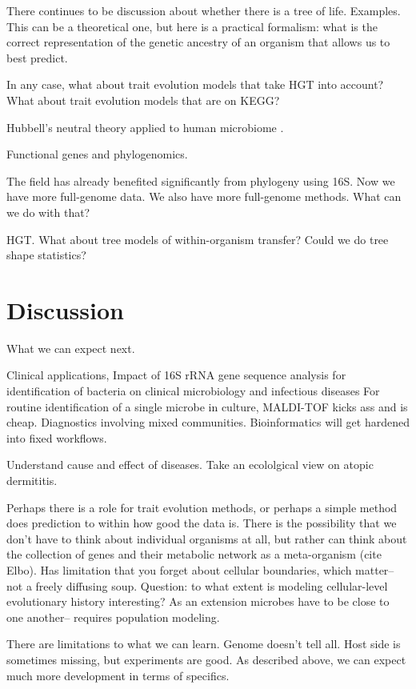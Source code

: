 \documentclass{amsart}
\begin{document}
There continues to be discussion about whether there is a tree of life.
Examples.
This can be a theoretical one, but here is a practical formalism: what is the correct representation of the genetic ancestry of an organism that allows us to best predict.

In any case, what about trait evolution models that take HGT into account?
What about trait evolution models that are on KEGG?

Hubbell's neutral theory applied to human microbiome \cite{fierer2012animalcules,costello2012application}.

Functional genes and phylogenomics.

The field has already benefited significantly from phylogeny using 16S.
Now we have more full-genome data.
We also have more full-genome methods.
What can we do with that?

HGT.
What about tree models of within-organism transfer?
Could we do tree shape statistics?


\section{Discussion}
What we can expect next.

Clinical applications,
\cite{clarridge2004}
{{I}mpact of 16{S} r{RNA} gene sequence analysis for identification of bacteria on clinical microbiology and infectious diseases}
For routine identification of a single microbe in culture, MALDI-TOF kicks ass and is cheap.
Diagnostics involving mixed communities.
Bioinformatics will get hardened into fixed workflows.

Understand cause and effect of diseases.
Take an ecololgical view on atopic dermititis.

Perhaps there is a role for trait evolution methods, or perhaps a simple method does prediction to within how good the data is.
There is the possibility that we don't have to think about individual organisms at all, but rather can think about the collection of genes and their metabolic network as a meta-organism (cite Elbo).
Has limitation that you forget about cellular boundaries, which matter-- not a freely diffusing soup.
Question: to what extent is modeling cellular-level evolutionary history interesting?
As an extension microbes have to be close to one another-- requires population modeling.

There are limitations to what we can learn.
Genome doesn't tell all.
Host side is sometimes missing, but experiments are good.
As described above, we can expect much more development in terms of specifics.
\cite{hooper2012interactions}
\end{document}
